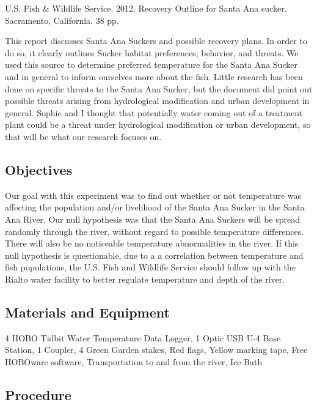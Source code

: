 \documentclass{article}
\begin{document}
U.S. Fish \& Wildlife Service. 2012. Recovery Outline for Santa Ana sucker. Sacramento, California. 38 pp.

This report discusses Santa Ana Suckers and possible recovery plans. In order to do so, it clearly outlines Sucker habitat preferences, behavior, and threats. We used this source to determine preferred temperature for the Santa Ana Sucker and in general to inform ourselves more about the fish. Little research has been done on specific threats to the Santa Ana Sucker, but the document did point out possible threats arising from hydrological modification and urban development in general. Sophie and I thought that potentially water coming out of a treatment plant could be a threat under hydrological modification or urban development, so that will be what our research focuses on.

\subsection{Objectives}
Our goal with this experiment was to find out whether or not temperature was affecting the population and/or livelihood of the Santa Ana Sucker in the Santa Ana River. Our null hypothesis was that the Santa Ana Suckers will be spread randomly through the river, without regard to possible temperature differences. There will also be no noticeable temperature abnormalities in the river. If this null hypothesis is questionable, due to a a correlation between temperature and fish populations, the U.S. Fish and Wildlife Service should follow up with the Rialto water facility to better regulate temperature and depth of the river.

\subsection{Materials and Equipment}

4 HOBO Tidbit Water Temperature Data Logger,
1 Optic USB U-4 Base Station,
1 Coupler,
4 Green Garden stakes,
Red flags,
Yellow marking tape,
Free HOBOware software,
Transportation to and from the river,
Ice Bath

\subsection{Procedure}
\end{document}
